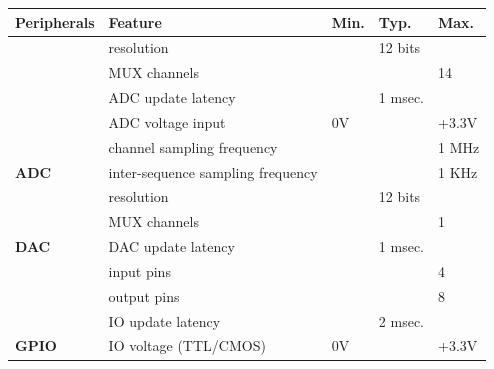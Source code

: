 \documentclass[letterpaper,10pt,english]{hitec}
\begin{document}
\begin{table}[h!]
\begin{tabular}{l|l|lll}
\rowcolor[HTML]{9B9B9B} 
\textbf{Peripherals}                                     & \textbf{Feature}                    & \textbf{Min.} & \textbf{Typ.} & \textbf{Max.} \\ \hline
\cellcolor[HTML]{C0C0C0}                                 & resolution                          &               & 12 bits       &               \\
\cellcolor[HTML]{C0C0C0}                                 & MUX channels                        &               &               & 14            \\
\cellcolor[HTML]{C0C0C0}                                 & ADC update latency                  &               & 1 msec.       &               \\
\cellcolor[HTML]{C0C0C0}                                 & ADC voltage input                   & 0V            &               & +3.3V         \\
\cellcolor[HTML]{C0C0C0}                                 & channel sampling frequency          &               &               & 1 MHz         \\
\multirow{-6}{*}{\cellcolor[HTML]{C0C0C0}\textbf{ADC}}   & inter-sequence sampling frequency   &               &               & 1 KHz         \\ \hline
\cellcolor[HTML]{C0C0C0}                                 & resolution                          &               & 12 bits       &               \\
\cellcolor[HTML]{C0C0C0}                                 & MUX channels                        &               &               & 1             \\
\multirow{-3}{*}{\cellcolor[HTML]{C0C0C0}\textbf{DAC}}   & DAC update latency                  &               & 1 msec.       &               \\ \hline
\cellcolor[HTML]{C0C0C0}                                 & input pins                          &               &               & 4             \\
\cellcolor[HTML]{C0C0C0}                                 & output pins                         &               &               & 8             \\
\cellcolor[HTML]{C0C0C0}                                 & IO update latency                   &               & 2 msec.       &               \\
\multirow{-4}{*}{\cellcolor[HTML]{C0C0C0}\textbf{GPIO}}  & IO voltage (TTL/CMOS)               & 0V            &               & +3.3V         \\ \hline

\end{tabular}
\end{table}
\end{document}
